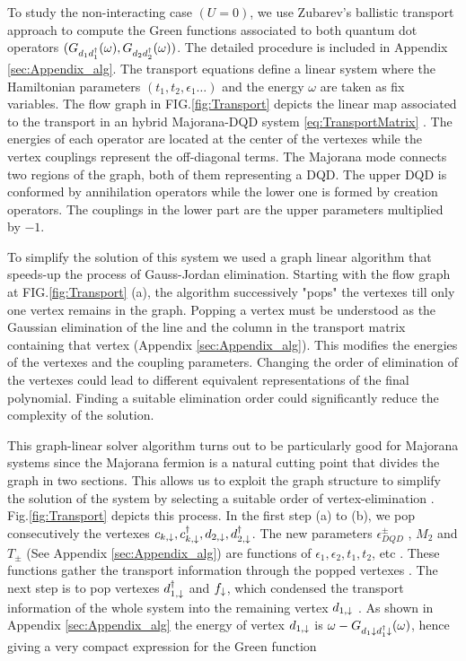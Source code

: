 \documentclass[showpacs,aps,prb,reprint,superscriptaddress]{revtex4-1}
\begin{document}
To study the non-interacting case $(U=0)$, we use Zubarev's ballistic transport approach \cite{zubarev_double-time_1960} to compute the Green functions associated to both quantum dot operators $(G_{d_1d^\dagger_1}(\omega),G_{d_2d^\dagger_2}(\omega))$. The detailed procedure is included in Appendix \ref{sec:Appendix_alg}. The transport equations define a linear system where the Hamiltonian parameters $(t_1,t_2,\epsilon_1 \ldots)$ and the energy $\omega$ are taken as fix variables. The flow graph in FIG.\ref{fig:Transport} depicts the linear map associated to the transport in an hybrid Majorana-DQD system  \eqref{eq:TransportMatrix} . The energies of each operator are located at the center of the vertexes while the vertex couplings represent the off-diagonal terms.  The Majorana mode connects two regions of the graph, both of them representing a DQD. The upper DQD is conformed by annihilation operators while the lower one is formed by creation operators. The couplings in the lower part are the  upper parameters multiplied by $-1$. 

To simplify the solution of this system we used a graph linear algorithm  that speeds-up the process of Gauss-Jordan elimination. \cite{spielman_algorithms_2010} Starting with the flow graph at FIG.\ref{fig:Transport} (a), the algorithm successively "pops"  the vertexes till only one vertex remains in the  graph. Popping a vertex must be understood as the Gaussian elimination of the line and the column in the transport matrix containing that vertex (Appendix \ref{sec:Appendix_alg}). This modifies the energies of the vertexes and the coupling parameters. Changing the order of elimination of the vertexes could lead to different equivalent representations of the final polynomial. Finding a suitable elimination order could significantly reduce the complexity of the solution. \cite{spielman_algorithms_2010}  


This graph-linear solver algorithm turns out to be particularly good for Majorana systems  since the Majorana fermion is a natural cutting point that divides the graph in two sections. This allows us to exploit the graph structure to simplify the solution of the system  by selecting a suitable order of vertex-elimination . Fig.\ref{fig:Transport} depicts this process. In the first step (a) to (b), we pop consecutively the vertexes $c_{k,\downarrow},c_{k,\downarrow}^\dagger , d_{2,\downarrow} , d^\dagger_{2,\downarrow}$. The new parameters $\epsilon^{\pm}_{DQD}$ , $M_2$ and $T_\pm$ (See Appendix \ref{sec:Appendix_alg}) are functions of $\epsilon_1 , \epsilon_2 , t_1,t_2$, etc . These functions gather the transport information  through the popped vertexes . The next step is to pop vertexes $d_{1,\downarrow}^\dagger$ and $f_{\downarrow}$, which condensed the transport information of the whole system into the remaining vertex $d_{1,\downarrow}$ . As shown in Appendix \ref{sec:Appendix_alg} the energy of vertex $d_{1,\downarrow}$ is $\omega - G_{d_1\downarrow d^\dagger_1\downarrow }(\omega) $, hence giving a very compact expression for the Green function
\end{document}
